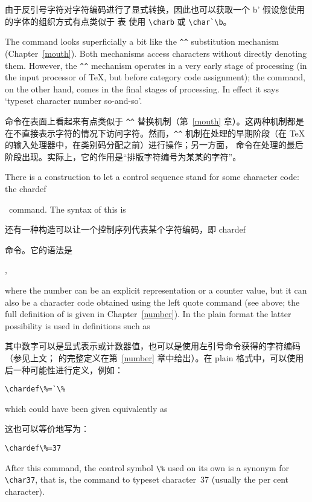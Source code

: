 由于反引号字符对字符编码进行了显式转换，因此也可以获取一个 b' \ldash 假设您使用的字体的组织方式有点类似于 \ascii{} 表 \rdash 使用 \verb.\charb. 或 \verb.\char`\b.。

The  command looks superficially a bit like
the \verb-^^- substitution mechanism (Chapter~\ref{mouth}).
Both mechanisms access characters without directly denoting them.
However, the \verb-^^- mechanism operates in a very early stage of
processing (in the input processor of \TeX,
but before category code
assignment); the  command, on the other hand,
comes in the final stages of processing. 
In effect it says `typeset character number
so-and-so'.
\awp

 命令在表面上看起来有点类似于 \verb-^^- 替换机制（第~\ref{mouth} 章）。这两种机制都是在不直接表示字符的情况下访问字符。然而，\verb-^^- 机制在处理的早期阶段（在 \TeX 的输入处理器中，在类别码分配之前）进行操作；另一方面， 命令在处理的最后阶段出现。实际上，它的作用是“排版字符编号为某某的字符”。

There is a construction to let a control sequence stand
for some character code: the \cstoidx chardef\par\ command.
The syntax of this is \label{chardef}

还有一种构造可以让一个控制序列代表某个字符编码，即 \cstoidx chardef\par 命令。它的语法是
\begin{disp}, 
\end{disp}
where the number can be an explicit
representation or a counter value, but it can also be
a character code
obtained using the left quote command (see above; 
the full definition of  is given in Chapter~\ref{number}). 
In the plain format 
the latter possibility is used in
definitions such as 

其中数字可以是显式表示或计数器值，也可以是使用左引号命令获得的字符编码（参见上文； 的完整定义在第~\ref{number} 章中给出）。在 plain 格式中，可以使用后一种可能性进行定义，例如：
\begin{verbatim}
\chardef\%=`\%
\end{verbatim}
which could have been given equivalently as

这也可以等价地写为：
\begin{verbatim}
\chardef\%=37
\end{verbatim}
After this command, the control symbol \verb>\%>
used on its own is a synonym for \verb>\char37>,
that is, the command to typeset character~37
(usually the per cent character).

